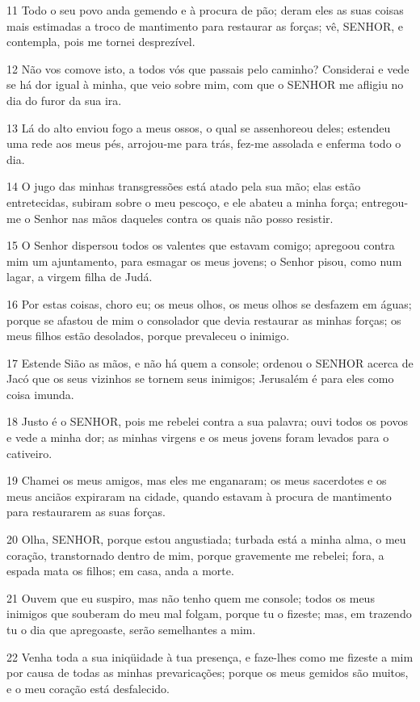 \par 11 Todo o seu povo anda gemendo e à procura de pão; deram eles as suas coisas mais estimadas a troco de mantimento para restaurar as forças; vê, SENHOR, e contempla, pois me tornei desprezível.
\par 12 Não vos comove isto, a todos vós que passais pelo caminho? Considerai e vede se há dor igual à minha, que veio sobre mim, com que o SENHOR me afligiu no dia do furor da sua ira.
\par 13 Lá do alto enviou fogo a meus ossos, o qual se assenhoreou deles; estendeu uma rede aos meus pés, arrojou-me para trás, fez-me assolada e enferma todo o dia.
\par 14 O jugo das minhas transgressões está atado pela sua mão; elas estão entretecidas, subiram sobre o meu pescoço, e ele abateu a minha força; entregou-me o Senhor nas mãos daqueles contra os quais não posso resistir.
\par 15 O Senhor dispersou todos os valentes que estavam comigo; apregoou contra mim um ajuntamento, para esmagar os meus jovens; o Senhor pisou, como num lagar, a virgem filha de Judá.
\par 16 Por estas coisas, choro eu; os meus olhos, os meus olhos se desfazem em águas; porque se afastou de mim o consolador que devia restaurar as minhas forças; os meus filhos estão desolados, porque prevaleceu o inimigo.
\par 17 Estende Sião as mãos, e não há quem a console; ordenou o SENHOR acerca de Jacó que os seus vizinhos se tornem seus inimigos; Jerusalém é para eles como coisa imunda.
\par 18 Justo é o SENHOR, pois me rebelei contra a sua palavra; ouvi todos os povos e vede a minha dor; as minhas virgens e os meus jovens foram levados para o cativeiro.
\par 19 Chamei os meus amigos, mas eles me enganaram; os meus sacerdotes e os meus anciãos expiraram na cidade, quando estavam à procura de mantimento para restaurarem as suas forças.
\par 20 Olha, SENHOR, porque estou angustiada; turbada está a minha alma, o meu coração, transtornado dentro de mim, porque gravemente me rebelei; fora, a espada mata os filhos; em casa, anda a morte.
\par 21 Ouvem que eu suspiro, mas não tenho quem me console; todos os meus inimigos que souberam do meu mal folgam, porque tu o fizeste; mas, em trazendo tu o dia que apregoaste, serão semelhantes a mim.
\par 22 Venha toda a sua iniqüidade à tua presença, e faze-lhes como me fizeste a mim por causa de todas as minhas prevaricações; porque os meus gemidos são muitos, e o meu coração está desfalecido.

